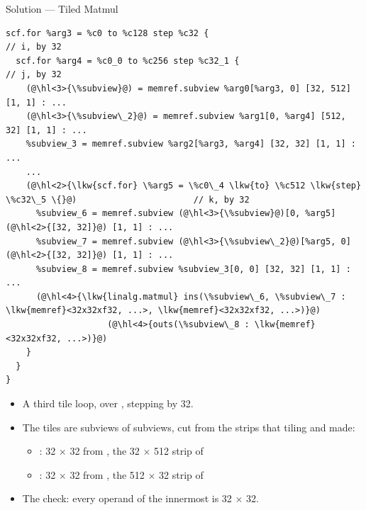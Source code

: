 \documentclass[aspectratio=169,10pt]{beamer}
\begin{document}
\begin{frame}[fragile]{Solution --- Tiled Matmul}
\begin{lstlisting}[language=mlir,basicstyle=\ttfamily\fontsize{6.4}{7.6}\selectfont]
scf.for %arg3 = %c0 to %c128 step %c32 {                                  // i, by 32
  scf.for %arg4 = %c0_0 to %c256 step %c32_1 {                            // j, by 32
    (@\hl<3>{\%subview}@) = memref.subview %arg0[%arg3, 0] [32, 512] [1, 1] : ...
    (@\hl<3>{\%subview\_2}@) = memref.subview %arg1[0, %arg4] [512, 32] [1, 1] : ...
    %subview_3 = memref.subview %arg2[%arg3, %arg4] [32, 32] [1, 1] : ...
    ...
    (@\hl<2>{\lkw{scf.for} \%arg5 = \%c0\_4 \lkw{to} \%c512 \lkw{step} \%c32\_5 \{}@)                       // k, by 32
      %subview_6 = memref.subview (@\hl<3>{\%subview}@)[0, %arg5] (@\hl<2>{[32, 32]}@) [1, 1] : ...
      %subview_7 = memref.subview (@\hl<3>{\%subview\_2}@)[%arg5, 0] (@\hl<2>{[32, 32]}@) [1, 1] : ...
      %subview_8 = memref.subview %subview_3[0, 0] [32, 32] [1, 1] : ...
      (@\hl<4>{\lkw{linalg.matmul} ins(\%subview\_6, \%subview\_7 : \lkw{memref}<32x32xf32, ...>, \lkw{memref}<32x32xf32, ...>)}@)
                    (@\hl<4>{outs(\%subview\_8 : \lkw{memref}<32x32xf32, ...>)}@)
    }
  }
}
\end{lstlisting}
  \vspace{0.2em}
  \begin{itemize}
    \item<2-> A third tile loop, over , stepping by 32.
    \item<3-> The  tiles are \alert{subviews of subviews}, cut from the
      strips that tiling  and  made:
      \begin{itemize}
        \item {}: 32 $\times$ 32 from , the
          32 $\times$ 512 strip of 
        \item {}: 32 $\times$ 32 from , the
          512 $\times$ 32 strip of 
      \end{itemize}
    \item<4-> The check: every operand of the innermost  is
      32 $\times$ 32.
  \end{itemize}
\end{frame}
\end{document}
